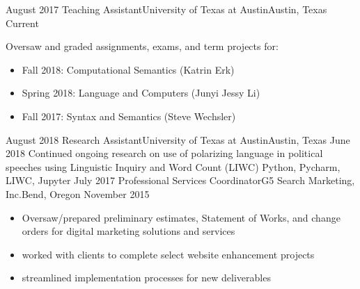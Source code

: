 %
%
%
\begin{experiences}
  \experience
    {August 2017}   {Teaching Assistant}{University of Texas at Austin}{Austin, Texas}
    {Current} { Oversaw and graded assignments, exams, and term projects for:
                      \begin{itemize}
                        \item Fall 2018: Computational Semantics (Katrin Erk) 
                        \item Spring 2018: Language and Computers (Junyi Jessy Li)  
                        \item Fall 2017: Syntax and Semantics (Steve Wechsler)  
                      \end{itemize}
                    }
  \emptySeparator
  \experiencetech
    {August 2018} {Research Assistant}{University of Texas at Austin}{Austin, Texas}
    {June 2018}    { Continued ongoing research on use of polarizing language in political speeches using Linguistic Inquiry and Word Count (LIWC)  }
                    {Python, Pycharm, LIWC, Jupyter}
  \emptySeparator
  \experiencetech
    {July 2017}     {Professional Services Coordinator}{G5 Search Marketing, Inc.}{Bend, Oregon}
    {November 2015}    {
                      \begin{itemize}
                        \item Oversaw/prepared preliminary estimates, Statement of Works, and change orders for digital marketing solutions and services 
                        \item worked with clients to  complete select website enhancement projects 
                        \item streamlined implementation processes for new deliverables


\end{itemize}}
\end{experiences}
